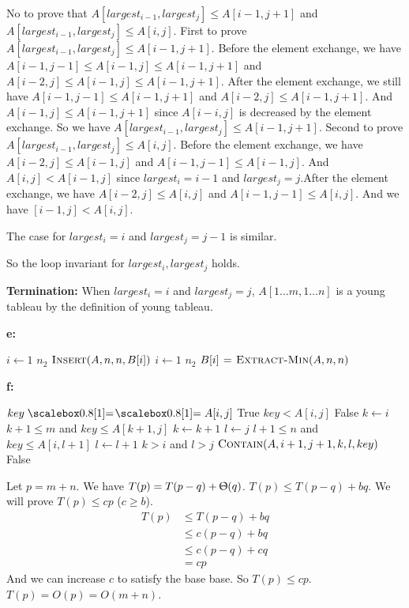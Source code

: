 \documentclass{book}
\begin{document}
\begin{CJK}{UTF8}{gkai}
No to prove that $A[largest_{i-1}, largest_j] \le A[i-1,j+1]$ and 
$A[largest_{i-1},largest_j] \le A[i,j]$. First to prove 
$A[largest_{i-1},largest_j] \le A[i-1,j+1]$.  Before the element exchange, we 
have $A[i-1,j-1] \le A[i-1,j] \le A[i-1,j+1]$ and $A[i-2,j] \le A[i-1,j] \le 
A[i-1,j+1]$. After the element exchange, we still have $A[i-1,j-1] \le 
A[i-1,j+1]$ and $A[i-2,j] \le A[i-1,j+1]$. And $A[i-1,j] \le A[i-1,j+1]$ since 
$A[i-i,j]$ is decreased by the element exchange. So we have $A[largest_{i-1}, 
largest_j] \le A[i-1,j+1]$.  Second to prove $A[largest_{i-1},largest_j] \le 
A[i,j]$. Before the element exchange, we have $A[i-2, j] \le A[i-1,j]$ and 
$A[i-1,j-1] \le A[i-1,j]$. And $A[i,j] < A[i-1,j]$ since $largest_i = i-1$ and 
$largest_j = j$.After the element exchange, we have $A[i-2,j] \le A[i,j]$ and 
$A[i-1,j-1] \le A[i,j]$. And we have $[i-1,j] < A[i,j]$.

The case for $largest_i = i$ and $largest_j = j-1$ is similar. 

So the loop invariant for $largest_i, largest_j$ holds.

\textbf{Termination:} When $largest_i = i$ and $largest_j = j$, $A[1\dots m, 
1\dots n]$ is a young tableau by the definition of young tableau.

\textbf{e:}
\begin{codebox}
\li \For $i \gets 1$ \To $n_2$
\li \Do $\textnormal{\scshape Insert}(A,n,n,B[i])$
\End
\li \For $i \gets 1$ \To $n_2$
\li \Do $B[i] \mathrel{\hspace{1pt}=\hspace{1pt}} \textnormal{\scshape Extract-Min}(A,n,n)$
\End
\end{codebox}

\textbf{f:}
\begin{codebox}
\li \If $key \isequal A[i,j]$
\li \Then \Return True
\li \ElseIf $key < A[i,j]$
\li \Then \Return False
\End
\li $k \gets i$
\li \While $k+1 \le m$ and $key \le A[k+1,j]$
\li \Do $k \gets k+1$
\End
\li $l \gets j$
\li \While $l+1 \le n$ and $key \le A[i,l+1]$
\li \Do $l \gets l+1$
\End
\li \If $k > i$ and $l > j$
\li \Then $\textnormal{\scshape Contain}(A,i+1,j+1,k,l,key)$
\li \Else \Return False
\End
\end{codebox}
Let $p = m+n$. We have $T(p) = T(p-q) + \Uptheta(q)$. $T(p) \le T(p-q) + bq$. We 
will prove $T(p) \le cp$ ($c \ge b$).
\begin{align*}
T(p) & \le T(p-q) + bq \\
& \le c(p-q) + bq \\
& \le c(p-q) + cq \\
& = cp
\end{align*}
And we can increase $c$ to satisfy the base base. So $T(p) \le cp$. $T(p) = O(p) 
= O(m+n)$.



\end{CJK}
\end{document}
